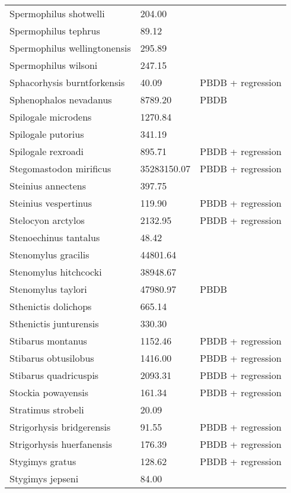 \begin{center}
\begin{longtable}{p{} p{} p{} }
  Spermophilus shotwelli & 204.00 & \cite{McKenna2011} \\ 
  Spermophilus tephrus & 89.12 & \cite{Tomiya2013} \\ 
  Spermophilus wellingtonensis & 295.89 & \cite{Tomiya2013} \\ 
  Spermophilus wilsoni & 247.15 & \cite{Tomiya2013} \\ 
  Sphacorhysis burntforkensis & 40.09 & PBDB + regression \\ 
  Sphenophalos nevadanus & 8789.20 & PBDB \\ 
  Spilogale microdens & 1270.84 & \cite{Chester2012} \\ 
  Spilogale putorius & 341.19 & \cite{Smith2004} \\ 
  Spilogale rexroadi & 895.71 & PBDB + regression \\ 
  Stegomastodon mirificus & 35283150.07 & PBDB + regression \\ 
  Steinius annectens & 397.75 & \cite{Strait2001} \\ 
  Steinius vespertinus & 119.90 & PBDB + regression \\ 
  Stelocyon arctylos & 2132.95 & PBDB + regression \\ 
  Stenoechinus tantalus & 48.42 & \cite{Tomiya2013} \\ 
  Stenomylus gracilis & 44801.64 & \cite{Tomiya2013} \\ 
  Stenomylus hitchcocki & 38948.67 & \cite{Tomiya2013} \\ 
  Stenomylus taylori & 47980.97 & PBDB \\ 
  Sthenictis dolichops & 665.14 & \cite{Tomiya2013} \\ 
  Sthenictis junturensis & 330.30 & \cite{Tomiya2013} \\ 
  Stibarus montanus & 1152.46 & PBDB + regression \\ 
  Stibarus obtusilobus & 1416.00 & PBDB + regression \\ 
  Stibarus quadricuspis & 2093.31 & PBDB + regression \\ 
  Stockia powayensis & 161.34 & PBDB + regression \\ 
  Stratimus strobeli & 20.09 & \cite{Tomiya2013} \\ 
  Strigorhysis bridgerensis & 91.55 & PBDB + regression \\ 
  Strigorhysis huerfanensis & 176.39 & PBDB + regression \\ 
  Stygimys gratus & 128.62 & PBDB + regression \\ 
  Stygimys jepseni & 84.00 & \cite{Wilson2012} \\ 

\end{longtable}
\end{center}
